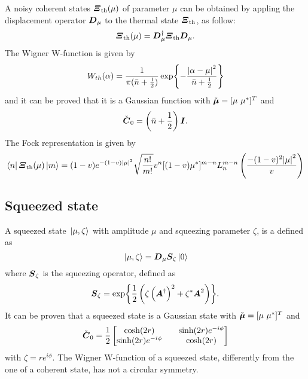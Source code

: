         A noisy coherent states $\bm{\relax{\varXi}}_{\mathrm{th}}(\mu)$ of parameter $\mu$ can be obtained by 
        appling the displacement operator $\bm{\relax{D}}_\mu$ to the thermal state $\bm{\relax{\varXi}}_{\mathrm{th}}$,
        as follow:
        \begin{equation}
            \bm{\relax{\varXi}}_{\mathrm{th}}(\mu)=\bm{\relax{D}}_\mu^\dagger \bm{\relax{\varXi}}_{\mathrm{th}} \bm{\relax{D}}_\mu.
        \end{equation}
        The Wigner W-function is given by \cite{QuantumNoise}
        \begin{equation}
            W_{th}(\alpha)=\frac{1}{\pi(\bar{n}+\frac{1}{2})}\exp{-\frac{\absolutevalue{\alpha-\mu}^2}
            {\bar{n}+\frac{1}{2}}}
            \label{WignerNCS}
        \end{equation}
        and it can be proved that it is a Gaussian function with $\check{\Vector{\mu}}=[\mu\ \mu^*]^T$
        and
        \begin{equation*}
            \check{\bm{\relax{C}}}_0=\left(\bar{n}+\frac{1}{2}\right)\bm{\relax{I}}.
        \end{equation*}
        The Fock representation is given by
        \begin{equation}
            \bra{n}\Operator{\varXi}_{\mathrm{th}}(\mu)\ket{m}=(1-v)e^{-(1-v)\absolutevalue{\mu}^2}\sqrt{\frac{n!}{m!}}
            v^n[(1-v)\mu^*]^{m-n}L_n^{m-n}\left(\frac{-(1-v)^2\absolutevalue{\mu}^2}{v}\right)
            \label{eq:FRCS}
        \end{equation}

    \subsection{Squeezed state}
        \label{squeezedStates}
        A squeezed state $\ket*{\mu,\zeta}$ with amplitude $\mu$ and squeezing parameter $\zeta$, is a defined as 
        \cite{tesiGuerrini,YuenRadField,QMnoiseInterf}
        \begin{equation}
            \ket*{\mu,\zeta}=\bm{\relax{D}}_\mu\bm{\relax{S}}_\zeta\ket{0}
        \end{equation}
        where $\bm{\relax{S}}_\zeta$ is the squeezing operator, defined as
        \begin{equation}
            \bm{\relax{S}}_\zeta=\exp{\frac{1}{2}\left(\zeta\left(\bm{\relax{A}}^\dagger\right)^2+
            \zeta^*\bm{\relax{A}}^2\right)}.
        \end{equation}
        It can be proven that a squeezed state is a Gaussian state with $\check{\Vector{\mu}}=[\mu\ \mu^*]^T$
        and
        \begin{equation*}
            \check{\bm{\relax{C}}}_0=\frac{1}{2}
            \begin{bmatrix}
                \cosh(2r) && \sinh(2r)e^{-i\phi}\\
                \sinh(2r)e^{-i\phi} && \cosh(2r)
            \end{bmatrix}
        \end{equation*}
        with $\zeta=re^{i\phi}$.
        The Wigner W-function of a squeezed state, differently from the one of a coherent state, has not a 
        circular symmetry.

